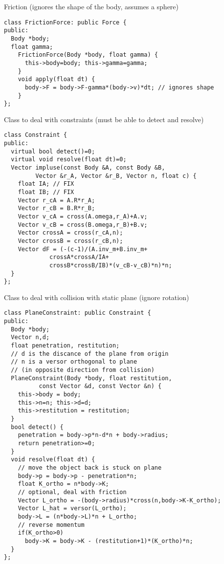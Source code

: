 Friction (ignores the shape of the body, assumes a sphere)
\begin{lstlisting}
class FrictionForce: public Force {
public:
  Body *body;
  float gamma;
    FrictionForce(Body *body, float gamma) {
      this->body=body; this->gamma=gamma;
    }
    void apply(float dt) {
      body->F = body->F-gamma*(body->v)*dt; // ignores shape
    }
};
\end{lstlisting}

Class to deal with constraints (must be able to detect and resolve)
\begin{lstlisting}
class Constraint {
public:  
  virtual bool detect()=0;
  virtual void resolve(float dt)=0;
  Vector impluse(const Body &A, const Body &B, 
		 Vector &r_A, Vector &r_B, Vector n, float c) {
    float IA; // FIX
    float IB; // FIX
    Vector r_cA = A.R*r_A;
    Vector r_cB = B.R*r_B;
    Vector v_cA = cross(A.omega,r_A)+A.v;
    Vector v_cB = cross(B.omega,r_B)+B.v;
    Vector crossA = cross(r_cA,n);
    Vector crossB = cross(r_cB,n);
    Vector dF = (-(c-1)/(A.inv_m+B.inv_m+
			 crossA*crossA/IA+
			 crossB*crossB/IB)*(v_cB-v_cB)*n)*n;
  }
};
\end{lstlisting}

Class to deal with collision with static plane
(ignore rotation)
\begin{lstlisting}
class PlaneConstraint: public Constraint {
public:
  Body *body;
  Vector n,d;
  float penetration, restitution;
  // d is the discance of the plane from origin
  // n is a versor orthogonal to plane 
  // (in opposite direction from collision)
  PlaneConstraint(Body *body, float restitution,
		  const Vector &d, const Vector &n) {
    this->body = body;
    this->n=n; this->d=d;
    this->restitution = restitution;
  }
  bool detect() {
    penetration = body->p*n-d*n + body->radius;
    return penetration>=0;
  }
  void resolve(float dt) {
    // move the object back is stuck on plane 
    body->p = body->p - penetration*n;
    float K_ortho = n*body->K;
    // optional, deal with friction 
    Vector L_ortho = -(body->radius)*cross(n,body->K-K_ortho);
    Vector L_hat = versor(L_ortho);
    body->L = (n*body->L)*n + L_ortho;
    // reverse momentum
    if(K_ortho>0)
      body->K = body->K - (restitution+1)*(K_ortho)*n;
  }
};
\end{lstlisting}

